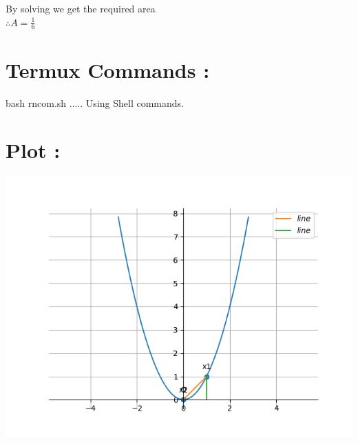 \documentclass[10pt,a4paper]{report}
\begin{document}
\begin{multicols}{2}
\centering By solving we get the required area\\
$\therefore A = \frac{1}{6}$ 



\section{Termux Commands :}
\centering bash rncom.sh ..... Using Shell commands.


\section{Plot :} 
\begin{center}
  \includegraphics[scale=0.55]{figure.png}
  	\end{center}

 
\end{multicols}
\end{document}
